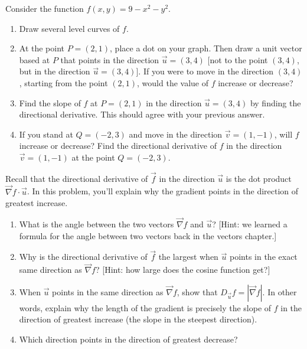 \begin{problem}%
 Consider the function $f(x,y) = 9-x^2-y^2$.
 \begin{enumerate}
  \item Draw several level curves of $f$. 
  \item At the point $P=(2,1)$, place a dot on your graph. Then draw a unit vector based at $P$ that points in the direction $\vec u=(3,4)$ [not to the point $(3,4)$, but in the direction $\vec u=(3,4)$]. If you were to move in the direction $(3,4)$, starting from the point $(2,1)$, would the value of $f$ increase or decrease?
  \item Find the slope of $f$ at $P=(2,1)$ in the direction $\vec u=(3,4)$ by finding the directional derivative. This should agree with your previous answer.
  \item If you stand at $Q=(-2,3)$ and move in the direction $\vec v= (1,-1)$, will $f$ increase or decrease?  Find the directional derivative of $f$ in the direction $\vec v=(1,-1)$ at the point $Q=(-2,3)$.
 \end{enumerate}
\end{problem}

\begin{problem}
Recall that the directional derivative of $\vec f$ in the direction $\vec u$ is the dot product $\vec \nabla f\cdot \vec u$. In this problem, you'll explain why the gradient points in the direction of greatest increase.
\begin{enumerate}
 \item What is the angle between the two vectors $\vec \nabla f$ and $\vec u$? [Hint: we learned a formula for the angle between two vectors back in the vectors chapter.]
 \item Why is the directional derivative of $\vec f$ the largest when $\vec u$ points in the exact same direction as $\vec \nabla f$? [Hint: how large does the cosine function get?]
 \item When $\vec u$ points in the same direction as $\vec \nabla f$, show that $D_{\vec u}f = |\vec \nabla f|$. In other words, explain why the length of the gradient is precisely the slope of $f$ in the direction of greatest increase (the slope in the steepest direction).
 \item Which direction points in the direction of greatest decrease?
\end{enumerate}
\end{problem}

